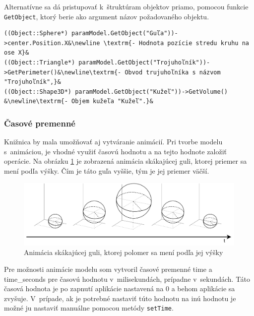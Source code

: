 Alternatívne sa dá pristupovať k~štruktúram objektov priamo, pomocou funkcie \newline \texttt{GetObject}, ktorý berie ako argument názov požadovaného objektu.
\begin{lstlisting}
((Object::Sphere*) paramModel.GetObject("Guľa"))->center.Position.X&\newline \textrm{- Hodnota pozície stredu kruhu na ose X}&
((Object::Triangle*) paramModel.GetObject("Trojuhoľník"))->GetPerimeter()&\newline\textrm{- Obvod trujuhoľníka s názvom "Trojuhoľník",}&
((Object::Shape3D*) paramModel.GetObject("Kužeľ"))->GetVolume() &\newline\textrm{- Objem kužeľa "Kužeľ".}&
\end{lstlisting}


\subsubsection*{Časové premenné}
Knižnica by mala umožňovať aj vytváranie animácií. Pri tvorbe modelu s~animáciou, je vhodné využiť časovú hodnotu a na tejto hodnote založiť operácie. Na obrázku \ref{fig:animation} je zobrazená animácia skákajúcej guli, ktorej priemer sa mení podľa výšky. Čím je táto guľa vyššie, tým je jej priemer väčší.



\begin{figure}[H]
	\centering
	\includegraphics[width=1\textwidth]{obrazky-figures/Diagram/DP Navrh operacii-Ball Animation.pdf}
	\caption{Animácia skákajúcej guli, ktorej polomer sa mení podľa jej výšky}
	\label{fig:animation}
\end{figure}



Pre možnosti animácie modelu som vytvoril časové premenné time a time\_seconds pre časovú hodnotu v~milisekundách, prípadne v~sekundách. Táto časová hodnota je po zapnutí aplikácie nastavená na 0 a behom aplikácie sa zvyšuje. V~prípade, ak je potrebné nastaviť túto hodnotu na inú hodnotu je možné ju nastaviť manuálne pomocou metódy \texttt{setTime}.\nopagebreak

